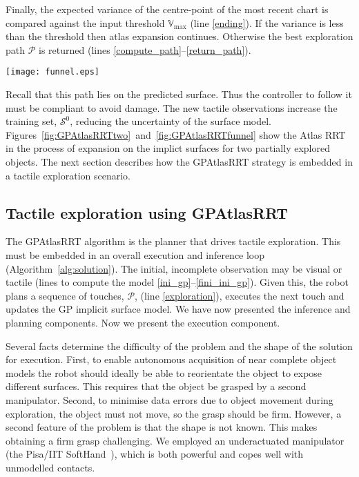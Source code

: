 Finally, the expected variance of the centre-point of the most recent chart is compared against the input threshold $\mathbb{V}_{\max}$ (line \ref{ending}). If the variance is less than the threshold then atlas expansion continues. Otherwise the best exploration path $\mathcal{P}$ is returned (lines \ref{compute_path}--\ref{return_path}). 
\begin{figure*}[hbt]
    \centering
    \texttt{[image: funnel.eps]}
    \caption{ A funnel (left-upper corner) is first seen by a depth camera. The segmented 3D points are shown in blue in the left figure to form the training set $\mathcal{S}^0$. The predicted shape by the GP on this set is shown in the middle obtained via a marching cube sampling algorithm. However, the GPAtlasRRT strategy does not require the explicit form of the predicted surface, as shown in the right figure. It works with the implicit form to devise the next-best tactile exploration shown in brighter green.}
    \label{fig:GPAtlasRRTfunnel}
\end{figure*}
Recall that this path lies on the predicted surface. Thus the controller to follow it must be compliant to avoid damage. The new tactile observations increase the training set, $\mathcal{S}^0$, reducing  the uncertainty of the surface model. Figures~\ref{fig:GPAtlasRRTtwo}~and~\ref{fig:GPAtlasRRTfunnel} show the Atlas RRT in the process of expansion on the implict surfaces for two partially explored objects. The next section describes how the GPAtlasRRT strategy is  embedded in a tactile exploration scenario.

\subsection{Tactile exploration using GPAtlasRRT}
\label{sec:gpatlasrrt_tactile_exploration}

The GPAtlasRRT algorithm is the planner that drives tactile exploration. This must be embedded in an overall execution and inference loop (Algorithm~\ref{alg:solution}). The initial, incomplete observation may be visual or tactile (lines to compute the model \ref{ini_gp}--\ref{fini_ini_gp}). Given this, the robot plans a sequence of touches, $\mathcal{P}$, (line \ref{exploration}), executes the next touch and updates the GP implicit surface model. We have now presented the inference and planning components. Now we present the execution component.

Several facts determine the difficulty of the problem and the shape of the solution for execution. First, to enable autonomous acquisition of near complete object models the robot should ideally be able to reorientate the object to expose different surfaces. This requires that the object be grasped by a second manipulator. Second, to minimise data errors due to object movement during exploration, the object must not move, so the grasp should be firm. However, a second feature of the problem is that the shape is not known. This makes obtaining a firm grasp challenging. We employed an underactuated manipulator (the Pisa/IIT
SoftHand~\cite{Catalano2014Adaptive}), which is both powerful and copes well with unmodelled contacts. 

